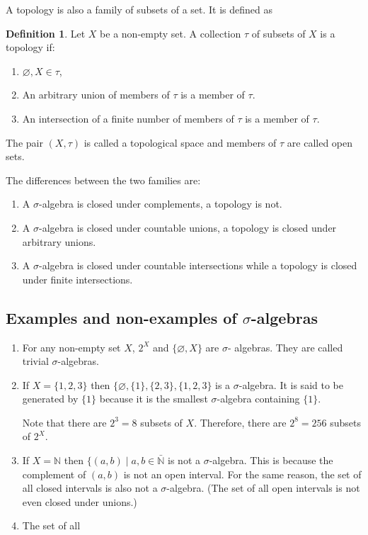 \documentclass{article}
\newcommand{\son}{\mathbb{N}}
\theoremstyle{plain}
\numberwithin{thm}{section}
\theoremstyle{plain}
\numberwithin{prop}{section}
\theoremstyle{definition}
\newtheorem{defn}{Definition}
\numberwithin{defn}{section}
\theoremstyle{remark}
\theoremstyle{plain}
\numberwithin{cor}{section}
\numberwithin{equation}{section}
\begin{document}
A topology is also a family of subsets of a set. It is defined as
\begin{defn}\label{s1d3}
Let $X$ be a non-empty set. A collection $\tau$ of subsets of $X$ is a topology
if:
\begin{enumerate}
\item $\varnothing, X \in \tau$,
\item An arbitrary union of members of $\tau$ is a member of $\tau$.
\item An intersection of a finite number of members of $\tau$ is a member of $\tau$.
\end{enumerate}
The pair $(X, \tau)$ is called a topological space and members of $\tau$ are
called open sets.
\end{defn}
The differences between the two families are:
\begin{enumerate}
\item A $\sigma$-algebra is closed under complements, a topology is not.
\item A $\sigma$-algebra is closed under countable unions, a topology is closed
under arbitrary unions.
\item A $\sigma$-algebra is closed under countable intersections while a topology
is closed under finite intersections.
\end{enumerate}

\subsection{Examples and non-examples of $\sigma$-algebras}
\begin{enumerate}
\item For any non-empty set $X$, $2^X$ and $\{\varnothing, X\}$ are $\sigma$-
algebras. They are called trivial $\sigma$-algebras.
\item If $X = \{1, 2, 3\}$ then $\{\varnothing, \{1\}, \{2, 3\}, \{1, 2, 3\}$ is
a $\sigma$-algebra. It is said to be generated by $\{1\}$ because it is the 
smallest $\sigma$-algebra containing $\{1\}$. 

Note that there are $2^3 = 8$ subsets of $X$. Therefore, there are $2^8 = 256$
subsets of $2^X$.
\item If $X = \son$ then $\{(a, b)\;|\; a, b \in \bar{\son}$ is not
a $\sigma$-algebra. This is because the complement of $(a, b)$ is not an open
interval. For the same reason, the set of all closed intervals is also not a
$\sigma$-algebra. (The set of all open intervals is not even closed under unions.)
\item The set of all 
\end{enumerate}
\end{document}
